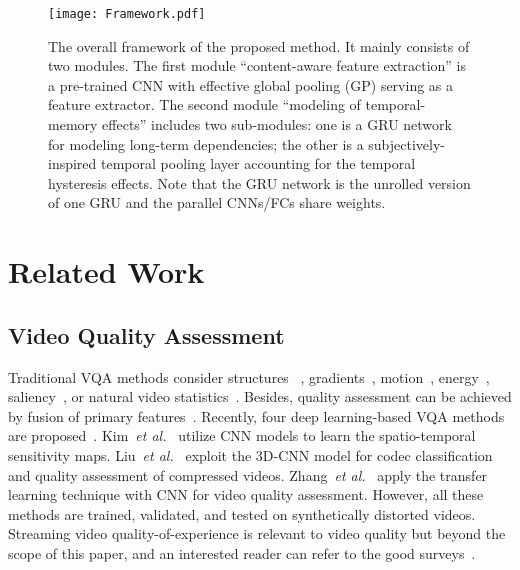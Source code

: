 \documentclass[sigconf]{acmart}
\begin{document}
\begin{figure*}[!htb]
    \centering
    \texttt{[image: Framework.pdf]}
    \caption{The overall framework of the proposed method. It mainly consists of two modules. The first module ``content-aware feature extraction'' is a pre-trained CNN with effective global pooling (GP) serving as a feature extractor. The second module ``modeling of temporal-memory effects'' includes two sub-modules: one is a GRU network for modeling long-term dependencies; the other is a subjectively-inspired temporal pooling layer accounting for the temporal hysteresis effects. Note that the GRU network is the unrolled version of one GRU and the parallel CNNs/FCs share weights.}
    \label{fig:framework}
\end{figure*}

\section{Related Work}
\label{sec:related}
\subsection{Video Quality Assessment}
Traditional VQA methods consider structures ~\cite{wang2004video,wang2012novel}, gradients~\cite{lu2019spatiotemporal}, motion~\cite{seshadrinathan2010motion,manasa2016optical-NR}, energy~\cite{li2016spatiotemporal}, saliency~\cite{zhang2017study, you2014attention}, or natural video statistics~\cite{ghadiyaram2017no,zhu2017blind,mittal2016completely,saad2014blind}.
Besides, quality assessment can be achieved by fusion of primary features~\cite{freitas2018using,li2016no}. 
Recently, four deep learning-based VQA methods are proposed~\cite{zhang2018blind,liu2018end,kim2018deep,zhang2019objective}.
Kim~\textit{et al.}~\cite{kim2018deep} utilize CNN models to learn the spatio-temporal sensitivity maps. 
Liu~\textit{et al.}~\cite{liu2018end} exploit the 3D-CNN model for codec classification and quality assessment of compressed videos. 
Zhang~\textit{et al.}~\cite{zhang2018blind,zhang2019objective} apply the transfer learning technique with CNN for video quality assessment.
However, all these methods are trained, validated, and tested on synthetically distorted videos. Streaming video quality-of-experience is relevant to video quality but beyond the scope of this paper, and an interested reader can refer to the good surveys~\cite{seufert2014survey,juluri2015measurement}.
\end{document}
